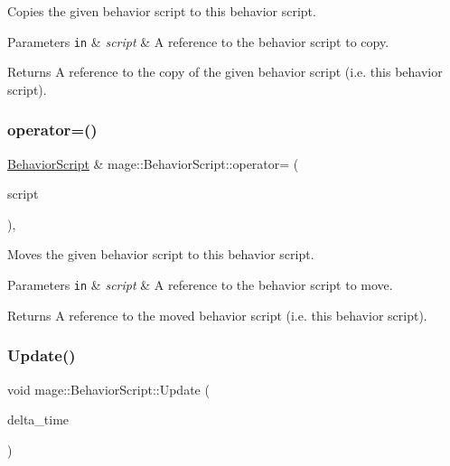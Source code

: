 Copies the given behavior script to this behavior script.


\begin{DoxyParams}[1]{Parameters}
\mbox{\tt in}  & {\em script} & A reference to the behavior script to copy. \\
\hline
\end{DoxyParams}
\begin{DoxyReturn}{Returns}
A reference to the copy of the given behavior script (i.\+e. this behavior script). 
\end{DoxyReturn}
\hypertarget{classmage_1_1_behavior_script_aefeae227ee8d2452bf05782604f5011e}{}\label{classmage_1_1_behavior_script_aefeae227ee8d2452bf05782604f5011e} 
\subsubsection{\texorpdfstring{operator=()}{operator=()}\hspace{0.1cm}{\footnotesize\ttfamily [2/2]}}
{\footnotesize\ttfamily \hyperlink{classmage_1_1_behavior_script}{Behavior\+Script} \& mage\+::\+Behavior\+Script\+::operator= (\begin{DoxyParamCaption}\item[{\hyperlink{classmage_1_1_behavior_script}{Behavior\+Script} \&\&}]{script }\end{DoxyParamCaption})\hspace{0.3cm}{\ttfamily [default]}, {\ttfamily [noexcept]}}

Moves the given behavior script to this behavior script.


\begin{DoxyParams}[1]{Parameters}
\mbox{\tt in}  & {\em script} & A reference to the behavior script to move. \\
\hline
\end{DoxyParams}
\begin{DoxyReturn}{Returns}
A reference to the moved behavior script (i.\+e. this behavior script). 
\end{DoxyReturn}
\hypertarget{classmage_1_1_behavior_script_afb9cf3759edf8876416d1df85489cba6}{}\label{classmage_1_1_behavior_script_afb9cf3759edf8876416d1df85489cba6} 
\subsubsection{\texorpdfstring{Update()}{Update()}}
{\footnotesize\ttfamily void mage\+::\+Behavior\+Script\+::\+Update (\begin{DoxyParamCaption}\item[{\mbox{[}\mbox{[}maybe\+\_\+unused\mbox{]} \mbox{]} \hyperlink{namespacemage_ad26233bbec640deda836e572c1a23708}{F64}}]{delta\+\_\+time }\end{DoxyParamCaption})\hspace{0.3cm}{\ttfamily [virtual]}}

